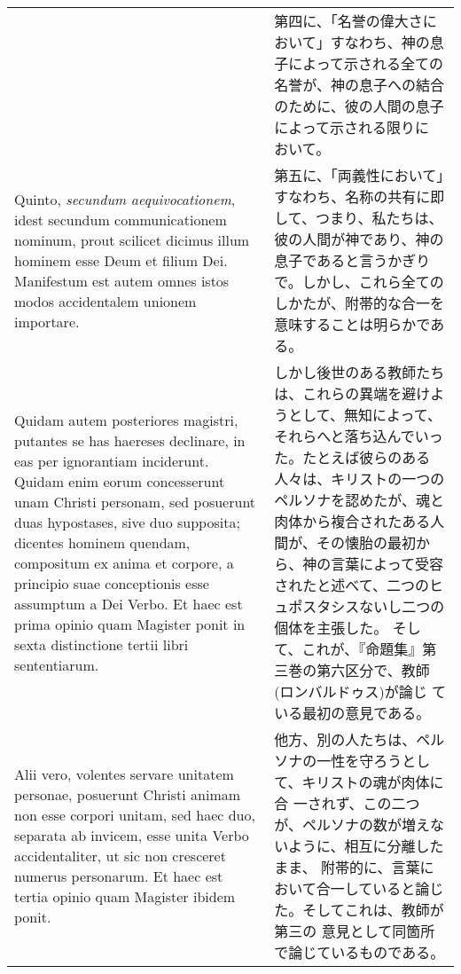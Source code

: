 \documentclass[10pt]{jsarticle} %
\begin{document}
\begin{longtable}{p{21em}p{21em}}
&

第四に、「名誉の偉大さにおいて」すなわち、神の息子によって示される全ての
 名誉が、神の息子への結合のために、彼の人間の息子によって示される限りに
 おいて。


\\

Quinto,
{\itshape secundum aequivocationem}, idest secundum communicationem nominum, prout
scilicet dicimus illum hominem esse Deum et filium Dei. Manifestum est
autem omnes istos modos accidentalem unionem importare. 

&

第五に、「両義性において」すなわち、名称の共有に即して、つまり、私たちは、
 彼の人間が神であり、神の息子であると言うかぎりで。しかし、これら全ての
 しかたが、附帯的な合一を意味することは明らかである。


\\

Quidam autem
posteriores magistri, putantes se has haereses declinare, in eas per
ignorantiam inciderunt. Quidam enim eorum concesserunt unam Christi
personam, sed posuerunt duas hypostases, sive duo supposita; dicentes
hominem quendam, compositum ex anima et corpore, a principio suae
conceptionis esse assumptum a Dei Verbo. 
Et haec est prima opinio quam
Magister ponit in sexta distinctione tertii libri sententiarum.

&

しかし後世のある教師たちは、これらの異端を避けようとして、無知によって、
 それらへと落ち込んでいった。たとえば彼らのある人々は、キリストの一つの
 ペルソナを認めたが、魂と肉体から複合されたある人間が、その懐胎の最初か
 ら、神の言葉によって受容されたと述べて、二つのヒュポスタシスないし二つの個体を主張した。
そして、これが、『命題集』第三巻の第六区分で、教師(ロンバルドゥス)が論じ
 ている最初の意見である。


\\

 Alii
vero, volentes servare unitatem personae, posuerunt Christi animam non
esse corpori unitam, sed haec duo, separata ab invicem, esse unita Verbo
accidentaliter, ut sic non cresceret numerus personarum. Et haec est
tertia opinio quam Magister ibidem ponit. 

&

他方、別の人たちは、ペルソナの一性を守ろうとして、キリストの魂が肉体に合
 一されず、この二つが、ペルソナの数が増えないように、相互に分離したまま、
 附帯的に、言葉において合一していると論じた。そしてこれは、教師が第三の
 意見として同箇所で論じているものである。


\end{longtable}
\end{document}
